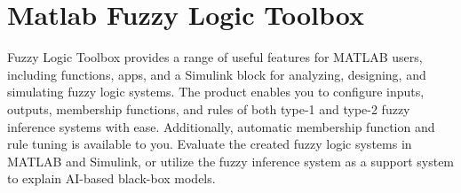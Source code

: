 \section{Matlab Fuzzy Logic Toolbox}

Fuzzy Logic Toolbox provides a range of useful features for MATLAB users, including functions, apps, and a Simulink block for analyzing, designing, and simulating fuzzy logic systems. The product enables you to configure inputs, outputs, membership functions, and rules of both type-1 and type-2 fuzzy inference systems with ease. Additionally, automatic membership function and rule tuning is available to you. Evaluate the created fuzzy logic systems in MATLAB and Simulink, or utilize the fuzzy inference system as a support system to explain AI-based black-box models.\cite{UserGuide}